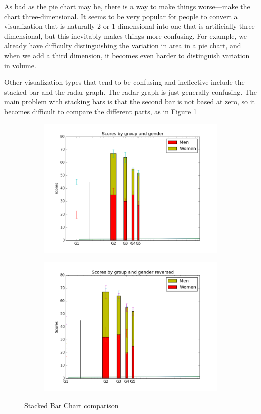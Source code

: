 As bad as the pie chart may be, there is a way to make things worse---make the chart three-dimensional.  It seems to be very popular for people to convert a visualization that is naturally 2 or 1 dimensional into one that is artificially three dimensional, but this inevitably makes things more confusing.  For example, we already have difficulty distinguishing the variation in area in a pie chart, and when we add a third dimension, it becomes even harder to distinguish variation in volume.


Other visualization types that tend to be confusing and ineffective include the stacked bar and the radar graph.  The radar graph is just generally confusing. The main problem with stacking bars is that the second bar is not based at zero, so it becomes difficult to compare the different parts, as in Figure \ref{fig:stacked}

\begin{figure}
\centering
\begin{subfigure}{.45\textwidth}
\centering
\includegraphics[width=\textwidth]{stackedbar.png}
\end{subfigure}
\begin{subfigure}{.45\textwidth}
\centering
\includegraphics[width=\textwidth]{stackedbarinv.png}
\end{subfigure}
\caption{Stacked Bar Chart comparison}
\label{fig:stacked}
\end{figure}

